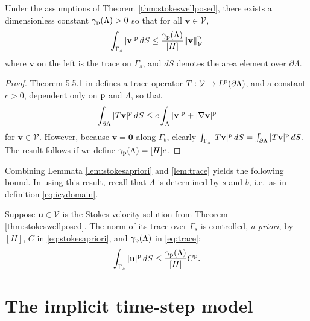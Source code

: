 \documentclass[hidelinks,onefignum,onetabnum,final]{siamart220329}  %
\newcommand{\grad}{\nabla}
\newcommand{\bu}{\mathbf{u}}
\newcommand{\bv}{\mathbf{v}}
\newcommand{\bzero}{\bm{0}}
\newcommand{\cV}{\mathcal{V}}
\newcommand{\pp}{{\text{\textnormal{p}}}}
\begin{document}
\begin{lemma} \label{lem:trace}
Under the assumptions of Theorem \ref{thm:stokeswellposed}, there exists a dimensionless constant $\gamma_{\pp}(\Lambda)>0$ so that for all $\bv \in \cV$,
\begin{equation}
\int_{\Gamma_s} |\bv|^\pp \,dS \le \frac{\gamma_{\pp}(\Lambda)}{[H]} \|\bv\|_{\cV}^\pp \label{eq:trace}
\end{equation}
where $\bv$ on the left is the trace on $\Gamma_s$, and $dS$ denotes the area element over $\partial\Lambda$.
\end{lemma}

\begin{proof}
Theorem 5.5.1 in \cite{Evans2010} defines a trace operator $T:\cV\to L^\pp(\partial\Lambda)$, and a constant $c>0$, dependent only on $\pp$ and $\Lambda$, so that
\begin{equation}
\int_{\partial\Lambda} |T\bv|^p\,dS \le c \int_{\Lambda} |\bv|^\pp + |\grad\bv|^\pp \label{eq:tracework}
\end{equation}
for $\bv\in\cV$.  However, because $\bv=\bzero$ along $\Gamma_b$, clearly $\int_{\Gamma_s} |T\bv|^\pp\,dS = \int_{\partial\Lambda} |T\bv|^\pp\,dS$.  The result follows if we define $\gamma_{\pp}(\Lambda)=[H] c$.
\end{proof}

Combining Lemmata \ref{lem:stokesapriori} and \ref{lem:trace} yields the following bound.  In using this result, recall that $\Lambda$ is determined by $s$ and $b$, i.e.~as in definition \eqref{eq:icydomain}.

\begin{corollary} \label{cor:surfacetracebound}
Suppose $\bu\in\cV$ is the Stokes velocity solution from Theorem \ref{thm:stokeswellposed}.  The norm of its trace over $\Gamma_s$ is controlled, \emph{a priori}, by $[H]$, $C$ in \eqref{eq:stokesapriori}, and $\gamma_{\pp}(\Lambda)$ in \eqref{eq:trace}:
\begin{equation}
\int_{\Gamma_s} |\bu|^\pp \,dS \le \frac{\gamma_{\pp}(\Lambda)}{[H]} C^\pp. \label{eq:surfacetracebound}
\end{equation}
\end{corollary}


\section{The implicit time-step model} \label{sec:model}
\end{document}
